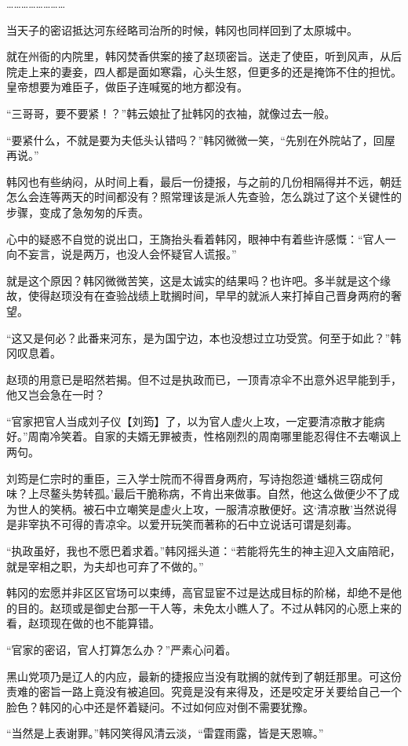 ……………………

当天子的密诏抵达河东经略司治所的时候，韩冈也同样回到了太原城中。

就在州衙的内院里，韩冈焚香供案的接了赵顼密旨。送走了使臣，听到风声，从后院走上来的妻妾，四人都是面如寒霜，心头生怒，但更多的还是掩饰不住的担忧。皇帝想要为难臣子，做臣子连喊冤的地方都没有。

“三哥哥，要不要紧！？”韩云娘扯了扯韩冈的衣袖，就像过去一般。

“要紧什么，不就是要为夫低头认错吗？”韩冈微微一笑，“先别在外院站了，回屋再说。”

韩冈也有些纳闷，从时间上看，最后一份捷报，与之前的几份相隔得并不远，朝廷怎么会连等两天的时间都没有？照常理该是派人先查验，怎么跳过了这个关键性的步骤，变成了急匆匆的斥责。

心中的疑惑不自觉的说出口，王旖抬头看着韩冈，眼神中有着些许感慨：“官人一向不妄言，说是两万，也没人会怀疑官人谎报。”

就是这个原因？韩冈微微苦笑，这是太诚实的结果吗？也许吧。多半就是这个缘故，使得赵顼没有在查验战绩上耽搁时间，早早的就派人来打掉自己晋身两府的奢望。

“这又是何必？此番来河东，是为国宁边，本也没想过立功受赏。何至于如此？”韩冈叹息着。

赵顼的用意已是昭然若揭。但不过是执政而已，一顶青凉伞不出意外迟早能到手，他又岂会急在一时？

“官家把官人当成刘子仪【刘筠】了，以为官人虚火上攻，一定要清凉散才能病好。”周南冷笑着。自家的夫婿无罪被责，性格刚烈的周南哪里能忍得住不去嘲讽上两句。

刘筠是仁宗时的重臣，三入学士院而不得晋身两府，写诗抱怨道‘蟠桃三窃成何味？上尽鳌头势转孤。’最后干脆称病，不肯出来做事。自然，他这么做便少不了成为世人的笑柄。被石中立嘲笑是虚火上攻，一服清凉散便好。这‘清凉散’当然说得是非宰执不可得的青凉伞。以爱开玩笑而著称的石中立说话可谓是刻毒。

“执政虽好，我也不愿巴着求着。”韩冈摇头道：“若能将先生的神主迎入文庙陪祀，就是宰相之职，为夫却也可弃了不做的。”

韩冈的宏愿并非区区官场可以束缚，高官显宦不过是达成目标的阶梯，却绝不是他的目的。赵顼或是御史台那一干人等，未免太小瞧人了。不过从韩冈的心愿上来的看，赵顼现在做的也不能算错。

“官家的密诏，官人打算怎么办？”严素心问着。

黑山党项乃是辽人的内应，最新的捷报应当没有耽搁的就传到了朝廷那里。可这份责难的密旨一路上竟没有被追回。究竟是没有来得及，还是咬定牙关要给自己一个脸色？韩冈的心中还是怀着疑问。不过如何应对倒不需要犹豫。

“当然是上表谢罪。”韩冈笑得风清云淡，“雷霆雨露，皆是天恩嘛。”

